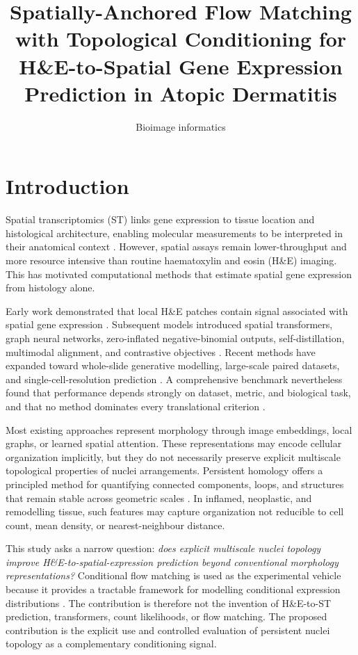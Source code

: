 \documentclass[nocrop]{bioinfo}
\subtitle{Bioimage informatics}
\title{Spatially-Anchored Flow Matching with Topological Conditioning for H\&E-to-Spatial Gene Expression Prediction in Atopic Dermatitis}
\author{\authorinfo}
\begin{document}
\maketitle

\section{Introduction}

Spatial transcriptomics (ST) links gene expression to tissue location and
histological architecture, enabling molecular measurements to be interpreted
in their anatomical context \citep{stahl2016visualization}. However, spatial
assays remain lower-throughput and more resource intensive than routine
haematoxylin and eosin (H\&E) imaging. This has motivated computational
methods that estimate spatial gene expression from histology alone.

Early work demonstrated that local H\&E patches contain signal associated
with spatial gene expression \citep{he2020integrating}. Subsequent models
introduced spatial transformers, graph neural networks, zero-inflated
negative-binomial outputs, self-distillation, multimodal alignment, and
contrastive objectives
\citep{zeng2022hist2st,xie2023bleep,jia2023thitogene,min2024mclstexp}.
Recent methods have expanded toward whole-slide generative modelling,
large-scale paired datasets, and single-cell-resolution prediction
\citep{huang2025stflow,jaume2024hest,chen2024stimage,fu2025ghist}.
A comprehensive benchmark nevertheless found that performance depends
strongly on dataset, metric, and biological task, and that no method dominates
every translational criterion \citep{wang2025benchmarking}.

Most existing approaches represent morphology through image embeddings,
local graphs, or learned spatial attention. These representations may encode
cellular organization implicitly, but they do not necessarily preserve
explicit multiscale topological properties of nuclei arrangements.
Persistent homology offers a principled method for quantifying connected
components, loops, and structures that remain stable across geometric scales
\citep{bubenik2015landscapes}. In inflamed, neoplastic, and remodelling
tissue, such features may capture organization not reducible to cell count,
mean density, or nearest-neighbour distance.

This study asks a narrow question: \emph{does explicit multiscale nuclei
topology improve H\&E-to-spatial-expression prediction beyond conventional
morphology representations?} Conditional flow matching is used as the
experimental vehicle because it provides a tractable framework for modelling
conditional expression distributions \citep{lipman2023flow}. The contribution
is therefore not the invention of H\&E-to-ST prediction, transformers, count
likelihoods, or flow matching. The proposed contribution is the explicit use
and controlled evaluation of persistent nuclei topology as a complementary
conditioning signal.
\end{document}

